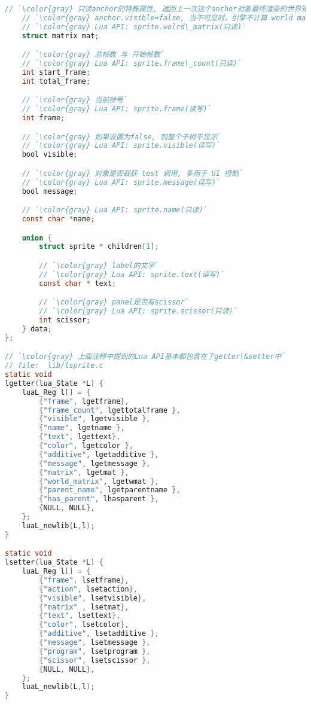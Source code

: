 {\begin{lstlisting}[language=C]
    // `\color{gray} 只读anchor的特殊属性, 返回上一次这个anchor对象最终渲染的世界矩阵`
    // `\color{gray} anchor.visible=false, 当不可显时，引擎不计算 world matrix`
    // `\color{gray} Lua API: sprite.wolrd\_matrix(只读)`
    struct matrix mat;

    // `\color{gray} 总帧数 与 开始帧数`
    // `\color{gray} Lua API: sprite.frame\_count(只读)`
    int start_frame;
    int total_frame;

    // `\color{gray} 当前帧号`
    // `\color{gray} Lua API: sprite.frame(读写)`
    int frame;

    // `\color{gray} 如果设置为false, 则整个子树不显示`
    // `\color{gray} Lua API: sprite.visible(读写)`
    bool visible;

    // `\color{gray} 对象是否截获 test 调用, 多用于 UI 控制`
    // `\color{gray} Lua API: sprite.message(读写)`
    bool message;

    // `\color{gray} Lua API: sprite.name(只读)`
    const char *name;

    union {
        struct sprite * children[1];

        // `\color{gray} label的文字`
        // `\color{gray} Lua API: sprite.text(读写)`
        const char * text;

        // `\color{gray} panel是否有scissor`
        // `\color{gray} Lua API: sprite.scissor(只读)`
        int scissor;
    } data;
};

// `\color{gray} 上面注释中提到的Lua API基本都包含在了getter\&setter中`
// file:  lib/lsprite.c
static void
lgetter(lua_State *L) {
    luaL_Reg l[] = {
        {"frame", lgetframe},
        {"frame_count", lgettotalframe },
        {"visible", lgetvisible },
        {"name", lgetname },
        {"text", lgettext},
        {"color", lgetcolor },
        {"additive", lgetadditive },
        {"message", lgetmessage },
        {"matrix", lgetmat },
        {"world_matrix", lgetwmat },
        {"parent_name", lgetparentname },
        {"has_parent", lhasparent },
        {NULL, NULL},
    };
    luaL_newlib(L,l);
}

static void
lsetter(lua_State *L) {
    luaL_Reg l[] = {
        {"frame", lsetframe},
        {"action", lsetaction},
        {"visible", lsetvisible},
        {"matrix" , lsetmat},
        {"text", lsettext},
        {"color", lsetcolor},
        {"additive", lsetadditive },
        {"message", lsetmessage },
        {"program", lsetprogram },
        {"scissor", lsetscissor },
        {NULL, NULL},
    };
    luaL_newlib(L,l);
}
\end{lstlisting}

}
